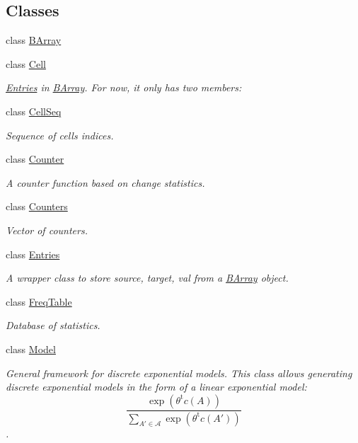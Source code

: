 \subsection*{Classes}
\begin{DoxyCompactItemize}
\item 
class \hyperlink{classbarry_1_1_b_array}{B\+Array}
\item 
class \hyperlink{classbarry_1_1_cell}{Cell}
\begin{DoxyCompactList}\small\item\em \hyperlink{classbarry_1_1_entries}{Entries} in \hyperlink{classbarry_1_1_b_array}{B\+Array}. For now, it only has two members\+: \end{DoxyCompactList}\item 
class \hyperlink{classbarry_1_1_cell_seq}{Cell\+Seq}
\begin{DoxyCompactList}\small\item\em Sequence of cells indices. \end{DoxyCompactList}\item 
class \hyperlink{classbarry_1_1_counter}{Counter}
\begin{DoxyCompactList}\small\item\em A counter function based on change statistics. \end{DoxyCompactList}\item 
class \hyperlink{classbarry_1_1_counters}{Counters}
\begin{DoxyCompactList}\small\item\em Vector of counters. \end{DoxyCompactList}\item 
class \hyperlink{classbarry_1_1_entries}{Entries}
\begin{DoxyCompactList}\small\item\em A wrapper class to store {\ttfamily source}, {\ttfamily target}, {\ttfamily val} from a {\ttfamily \hyperlink{classbarry_1_1_b_array}{B\+Array}} object. \end{DoxyCompactList}\item 
class \hyperlink{classbarry_1_1_freq_table}{Freq\+Table}
\begin{DoxyCompactList}\small\item\em Database of statistics. \end{DoxyCompactList}\item 
class \hyperlink{classbarry_1_1_model}{Model}
\begin{DoxyCompactList}\small\item\em General framework for discrete exponential models. This class allows generating discrete exponential models in the form of a linear exponential model\+: \[ \frac{ \exp{\left(\theta^{\mbox{t}}c(A)\right)} }{ \sum_{A'\in \mathcal{A}}\exp{\left(\theta^{\mbox{t}}c(A')\right)} } \]. \end{DoxyCompactList}\item 

\end{DoxyCompactItemize}
